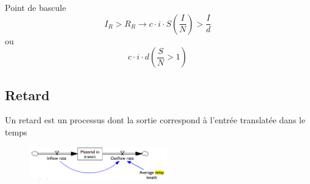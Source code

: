 \documentclass[resume]{subfiles}
\begin{document}
Point de bascule
$$I_R > R_R \rightarrow c\cdot i\cdot S(\frac{I}{N}) > \frac{I}{d}$$
ou
$$c\cdot i\cdot d(\frac{S}{N} > 1)$$

\subsection{Retard}

Un retard est un processus dont la sortie correspond à l’entrée translatée dans le temps

\begin{figure}[H]
\centering
\includegraphics[width=6.00cm]{img_24.png}
\end{figure}
\end{document}
